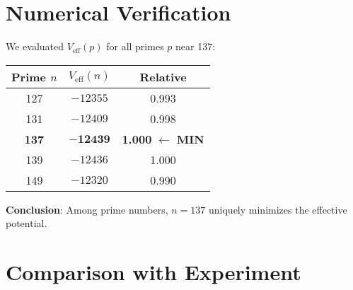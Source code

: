 \documentclass[12pt, a4paper]{article}
\begin{document}
\begin{center}
\end{center}

\section{Numerical Verification}

We evaluated $V_{\text{eff}}(p)$ for all primes $p$ near 137:

\begin{center}
\begin{tabular}{|c|c|c|}
\hline
\textbf{Prime $n$} & \textbf{$V_{\text{eff}}(n)$} & \textbf{Relative} \\
\hline
127 & $-12355$ & 0.993 \\
131 & $-12409$ & 0.998 \\
\rowcolor{green!20}
\textbf{137} & $\mathbf{-12439}$ & \textbf{1.000} $\leftarrow$ \textbf{MIN} \\
139 & $-12436$ & 1.000 \\
149 & $-12320$ & 0.990 \\
\hline
\end{tabular}
\end{center}

\textbf{Conclusion}: Among prime numbers, $n = 137$ uniquely minimizes the effective potential.

\section{Comparison with Experiment}

\begin{center}
\end{center}
\end{document}
